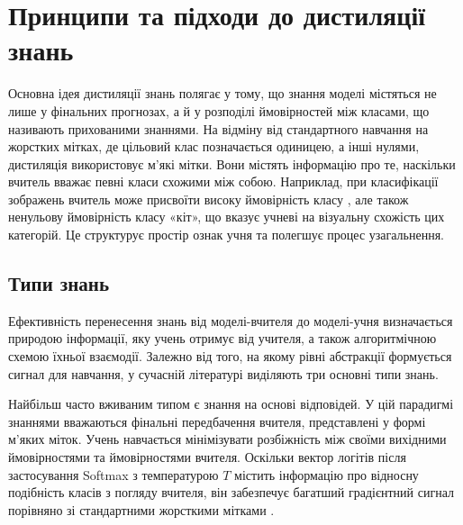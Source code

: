 \documentclass{pma-mthesis}
\begin{document}
\section{Принципи та підходи до дистиляції знань}

Основна ідея дистиляції знань полягає у тому, що знання моделі містяться не лише у фінальних прогнозах, а й у розподілі ймовірностей між класами, що називають прихованими знаннями. На відміну від стандартного навчання на жорстких мітках, де цільовий клас позначається одиницею, а інші нулями, дистиляція використовує м'які мітки. Вони містять інформацію про те, наскільки вчитель вважає певні класи схожими між собою. Наприклад, при класифікації зображень вчитель може присвоїти високу ймовірність класу , але також ненульову ймовірність класу «кіт», що вказує учневі на візуальну схожість цих категорій. Це структурує простір ознак учня та полегшує процес узагальнення.

\subsection{Типи знань}

Ефективність перенесення знань від моделі-вчителя до моделі-учня визначається природою інформації, яку учень отримує від учителя, а також алгоритмічною схемою їхньої взаємодії. Залежно від того, на якому рівні абстракції формується сигнал для навчання, у сучасній літературі виділяють три основні типи знань.

Найбільш часто вживаним типом є знання на основі відповідей. У цій парадигмі знаннями вважаються фінальні передбачення вчителя, представлені у формі м'яких міток. Учень навчається мінімізувати розбіжність між своїми вихідними ймовірностями та ймовірностями вчителя. Оскільки вектор логітів після застосування Softmax з температурою $T$ містить інформацію про відносну подібність класів з погляду вчителя, він забезпечує багатший градієнтний сигнал порівняно зі стандартними жорсткими мітками \cite{hinton2014distilling}. 
\end{document}
